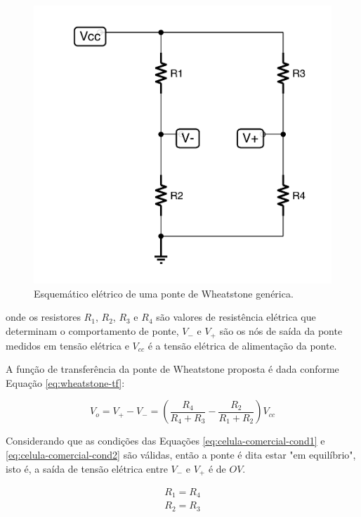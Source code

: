 \documentclass[a4paper]{instrumentacao}
\begin{document}
\begin{figure}[H]
\center
\includegraphics[width=\textwidth]{Wheatstone.pdf}
\caption{Esquemático elétrico de uma ponte de Wheatstone genérica.}
\label{fig:celula-comercial-circuito}
\end{figure}

\noindent onde os resistores $R_1$, $R_2$, $R_3$ e $R_4$ são valores de resistência elétrica que determinam o comportamento de ponte, $V_-$ e $V_+$ são os nós de saída da ponte medidos em tensão elétrica e $V_{cc}$ é a tensão elétrica de alimentação da ponte.

A função de transferência da ponte de Wheatstone proposta é dada conforme Equação \ref{eq:wheatstone-tf}:

\begin{equation}
	V_o = V_+ - V_- = \left(\dfrac{R_4}{R_4 + R_3} - \dfrac{R_2}{R_1 + R_2}\right)V_{cc}
	\label{eq:wheatstone-tf}
\end{equation}

Considerando que as condições das Equações \ref{eq:celula-comercial-cond1} e \ref{eq:celula-comercial-cond2} são válidas, então a ponte é dita estar "em equilíbrio", isto é, a saída de tensão elétrica entre $V_-$ e $V_+$ é de $OV$.

\begin{eqnarray}
	R_1 = R_4 \label{eq:celula-comercial-cond1} \\
	R_2 = R_3 \label{eq:celula-comercial-cond2}
\end{eqnarray} 
\end{document}
